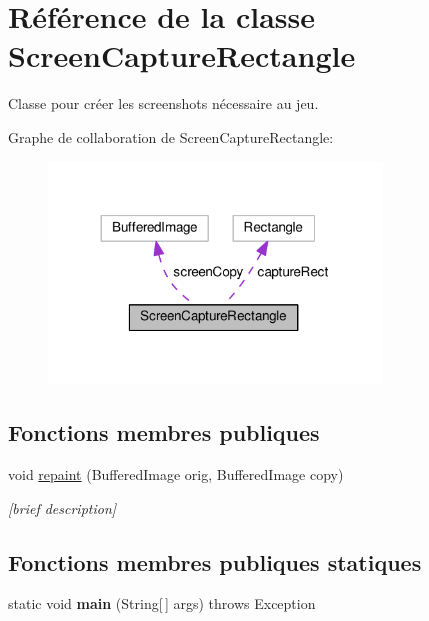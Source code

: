 \hypertarget{classScreenCaptureRectangle}{\section{Référence de la classe Screen\+Capture\+Rectangle}
\label{classScreenCaptureRectangle}
}


Classe pour créer les screenshots nécessaire au jeu.  




Graphe de collaboration de Screen\+Capture\+Rectangle\+:\nopagebreak
\begin{figure}[H]
\begin{center}
\leavevmode
\includegraphics[width=251pt]{classScreenCaptureRectangle__coll__graph}
\end{center}
\end{figure}
\subsection*{Fonctions membres publiques}
\begin{DoxyCompactItemize}
\item 
void \hyperlink{classScreenCaptureRectangle_a2e065ce458964b134232f20e947d59aa}{repaint} (Buffered\+Image orig, Buffered\+Image copy)
\begin{DoxyCompactList}\small\item\em \mbox{[}brief description\mbox{]} \end{DoxyCompactList}\end{DoxyCompactItemize}
\subsection*{Fonctions membres publiques statiques}
\begin{DoxyCompactItemize}
\item 
\hypertarget{classScreenCaptureRectangle_ae7844603a26e5b4f73a3e023526c1a7e}{static void {\bfseries main} (String\mbox{[}$\,$\mbox{]} args)  throws Exception }\label{classScreenCaptureRectangle_ae7844603a26e5b4f73a3e023526c1a7e}

\end{DoxyCompactItemize}
